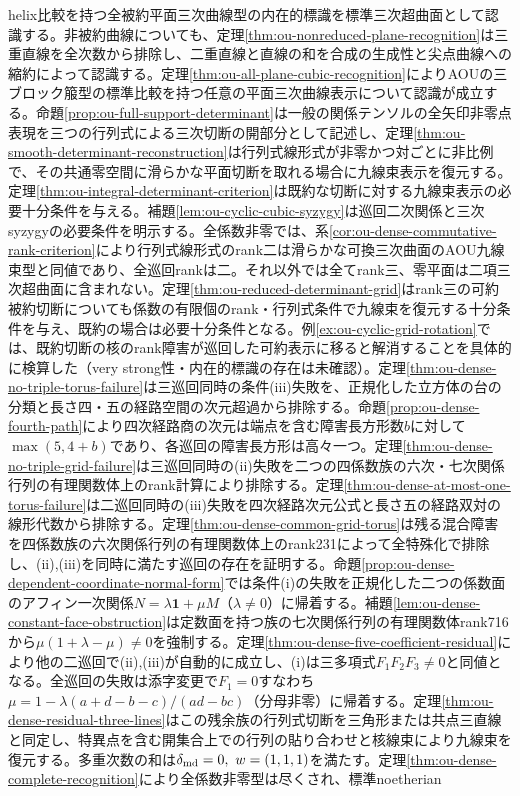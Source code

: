 \documentclass[11pt,a4paper]{ltjsarticle}
\theoremstyle{definition}
\begin{document}
helix比較を持つ全被約平面三次曲線型の内在的標識を標準三次超曲面として認識する。非被約曲線についても、定理\ref{thm:ou-nonreduced-plane-recognition}は三重直線を全次数から排除し、二重直線と直線の和を合成の生成性と尖点曲線への縮約によって認識する。定理\ref{thm:ou-all-plane-cubic-recognition}によりAOUの三ブロック箙型の標準比較を持つ任意の平面三次曲線表示について認識が成立する。命題\ref{prop:ou-full-support-determinant}は一般の関係テンソルの全矢印非零点表現を三つの行列式による三次切断の開部分として記述し、定理\ref{thm:ou-smooth-determinant-reconstruction}は行列式線形式が非零かつ対ごとに非比例で、その共通零空間に滑らかな平面切断を取れる場合に九線束表示を復元する。定理\ref{thm:ou-integral-determinant-criterion}は既約な切断に対する九線束表示の必要十分条件を与える。補題\ref{lem:ou-cyclic-cubic-syzygy}は巡回二次関係と三次syzygyの必要条件を明示する。全係数非零では、系\ref{cor:ou-dense-commutative-rank-criterion}により行列式線形式のrank二は滑らかな可換三次曲面のAOU九線束型と同値であり、全巡回rankは二。それ以外では全てrank三、零平面は二項三次超曲面に含まれない。定理\ref{thm:ou-reduced-determinant-grid}はrank三の可約被約切断についても係数の有限個のrank・行列式条件で九線束を復元する十分条件を与え、既約の場合は必要十分条件となる。例\ref{ex:ou-cyclic-grid-rotation}では、既約切断の核のrank障害が巡回した可約表示に移ると解消することを具体的に検算した（very strong性・内在的標識の存在は未確認）。定理\ref{thm:ou-dense-no-triple-torus-failure}は三巡回同時の条件(iii)失敗を、正規化した立方体の台の分類と長さ四・五の経路空間の次元超過から排除する。命題\ref{prop:ou-dense-fourth-path}により四次経路商の次元は端点を含む障害長方形数$b$に対して$\max(5,4+b)$であり、各巡回の障害長方形は高々一つ。定理\ref{thm:ou-dense-no-triple-grid-failure}は三巡回同時の(ii)失敗を二つの四係数族の六次・七次関係行列の有理関数体上のrank計算により排除する。定理\ref{thm:ou-dense-at-most-one-torus-failure}は二巡回同時の(iii)失敗を四次経路次元公式と長さ五の経路双対の線形代数から排除する。定理\ref{thm:ou-dense-common-grid-torus}は残る混合障害を四係数族の六次関係行列の有理関数体上のrank231によって全特殊化で排除し、(ii),(iii)を同時に満たす巡回の存在を証明する。命題\ref{prop:ou-dense-dependent-coordinate-normal-form}では条件(i)の失敗を正規化した二つの係数面のアフィン一次関係$N=\lambda\mathbf1+\mu M$（$\lambda\ne0$）に帰着する。補題\ref{lem:ou-dense-constant-face-obstruction}は定数面を持つ族の七次関係行列の有理関数体rank716から$\mu(1+\lambda-\mu)\ne0$を強制する。定理\ref{thm:ou-dense-five-coefficient-residual}により他の二巡回で(ii),(iii)が自動的に成立し、(i)は三多項式$F_1F_2F_3\ne0$と同値となる。全巡回の失敗は添字変更で$F_1=0$すなわち$\mu=1-\lambda(a+d-b-c)/(ad-bc)$（分母非零）に帰着する。定理\ref{thm:ou-dense-residual-three-lines}はこの残余族の行列式切断を三角形または共点三直線と同定し、特異点を含む開集合上での行列の貼り合わせと核線束により九線束を復元する。多重次数の和は$\delta_{\rm md}=0,\ w=(1,1,1)$を満たす。定理\ref{thm:ou-dense-complete-recognition}により全係数非零型は尽くされ、標準noetherian 
\end{document}

